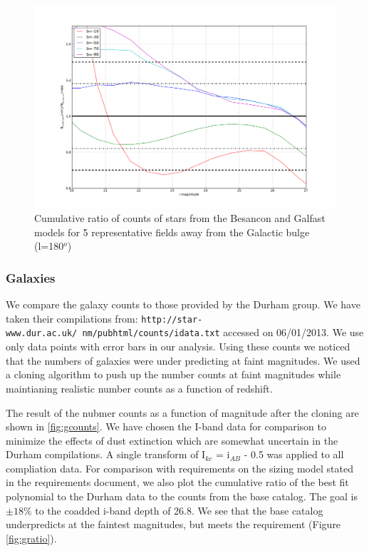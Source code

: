 \documentclass[]{article}
\begin{document}
\begin{figure}
\centering
\includegraphics[width=5in]{validation_figures/cumulative_ratio_stars.png}
\caption{Cumulative ratio of counts of stars from the Besancon and Galfast models for 5 representative fields away from the Galactic bulge (l=180$^o$) \label{fig:sratio_180}}
\end{figure}

\subsubsection{Galaxies \label{sec:galcounts}}
We compare the galaxy counts to those provided by the Durham group.  We have taken their compilations from:
{\tt http://star-www.dur.ac.uk/~nm/pubhtml/counts/idata.txt} accessed on 06/01/2013.  We use only data points with error bars in our analysis.  Using these counts
we noticed that the numbers of galaxies were under predicting at faint magnitudes.  We used a cloning algorithm to push up the number counts at faint magnitudes
while maintianing realistic number counts as a function of redshift.

The result of the nubmer counts as a function of magnitude after the cloning are shown in \ref{fig:gcounts}.  We have chosen the I-band data for comparison to 
minimize the effects of dust extinction which are somewhat uncertain in the Durham compilations.  A single transform of I$_{kc}$ = i$_{AB}$ - 0.5 was applied to
all compliation data.  For comparison with requirements on the sizing model stated in the requirements document, we also plot the cumulative ratio of the best fit polynomial
to the Durham data to the counts from the base catalog.  The goal is $\pm18\%$ to the coadded i-band depth of 26.8.  We see that the base catalog
underpredicts at the faintest magnitudes, but meets the requirement (Figure \ref{fig:gratio}).
\end{document}

